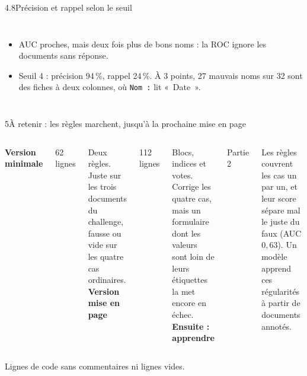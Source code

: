 \documentclass[11pt,aspectratio=169]{beamer}
\newcommand{\pct}[1]{#1\,\%}
\newcommand{\tok}[1]{\foreignlanguage{english}{\texttt{#1}}}
\begin{document}
\begin{frame}{4.8\quad Précision et rappel selon le seuil}
\begin{columns}[T]
    \medskip
    \raggedright\small
    \begin{itemize}\setlength{\itemsep}{1pt}
      \item AUC proches, mais deux fois plus de bons noms : la ROC ignore les documents
        sans réponse.
      \item Seuil 4 : précision \pct{94}, rappel \pct{24}. À 3 points, 27 mauvais noms sur
        32 sont des fiches à deux colonnes, où \tok{Nom :} lit «~Date~».
    \end{itemize}
  \end{columns}
\end{frame}

\begin{frame}{5\quad À retenir : les règles marchent, jusqu'à la prochaine mise en page}
  \begin{columns}[T]
    \textbf{Version minimale}\par\smallskip
    {\Large 62} lignes\par\smallskip
    \small Deux règles. Juste sur les trois documents du challenge, fausse ou vide sur les
    quatre cas ordinaires.
    \textbf{Version mise en page}\par\smallskip
    {\Large 112} lignes\par\smallskip
    \small Blocs, indices et votes. Corrige les quatre cas, mais un formulaire dont les
    valeurs sont loin de leurs étiquettes la met encore en échec.
    \textbf{Ensuite : apprendre}\par\smallskip
    {\Large Partie 2}\par\smallskip
    \small Les règles couvrent les cas un par un, et leur score sépare mal le juste du faux
    (AUC $0{,}63$). Un modèle apprend ces régularités à partir de documents annotés.
  \end{columns}

  \vspace{1.4em}
  \footnotesize Lignes de code sans commentaires ni lignes vides.
\end{frame}
\end{document}
